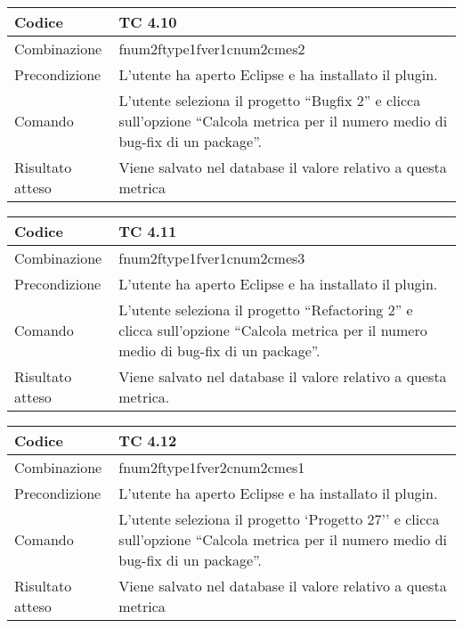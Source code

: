 \begin{table}[ht]
\begin{tabular}{|p{3cm}|p{9cm}|}
\hline
\cellcolor{lightgray}Codice				& TC 4.10								\\
\hline
\cellcolor{lightgray}Combinazione		& fnum2ftype1fver1cnum2cmes2 									\\
\hline
\cellcolor{lightgray}Precondizione		& L'utente ha aperto Eclipse e ha installato il plugin.									\\
\hline
\cellcolor{lightgray}Comando			& L'utente seleziona il progetto ``Bugfix 2''  e clicca sull'opzione ``Calcola metrica per il numero medio di bug-fix di un package''.	\\
\hline
\cellcolor{lightgray}Risultato atteso	& Viene salvato nel database il valore relativo a questa metrica	\\
\hline
\end{tabular}
\end{table}
\clearpage

\begin{table}[ht]
\begin{tabular}{|p{3cm}|p{9cm}|}
\hline
\cellcolor{lightgray}Codice				& TC 4.11								\\
\hline
\cellcolor{lightgray}Combinazione		& fnum2ftype1fver1cnum2cmes3									\\
\hline
\cellcolor{lightgray}Precondizione		& L'utente ha aperto Eclipse e ha installato il plugin.		\\
\hline
\cellcolor{lightgray}Comando			& L'utente seleziona il progetto ``Refactoring 2''  e clicca sull'opzione ``Calcola metrica per il numero medio di bug-fix di un package''.	\\
\hline
\cellcolor{lightgray}Risultato atteso	& Viene salvato nel database il valore relativo a questa metrica.\\
\hline
\end{tabular}
\end{table}

\begin{table}[ht]
\begin{tabular}{|p{3cm}|p{9cm}|}
\hline
\cellcolor{lightgray}Codice				& TC 4.12								\\
\hline
\cellcolor{lightgray}Combinazione		& fnum2ftype1fver2cnum2cmes1 									\\
\hline
\cellcolor{lightgray}Precondizione		& L'utente ha aperto Eclipse e ha installato il plugin.				\\
\hline
\cellcolor{lightgray}Comando			& L'utente seleziona il progetto `Progetto 27''  e clicca sull'opzione ``Calcola metrica per il numero medio di bug-fix di un package''.	\\
\hline
\cellcolor{lightgray}Risultato atteso	& Viene salvato nel database il valore relativo a questa metrica	\\
\hline
\end{tabular}
\end{table}

